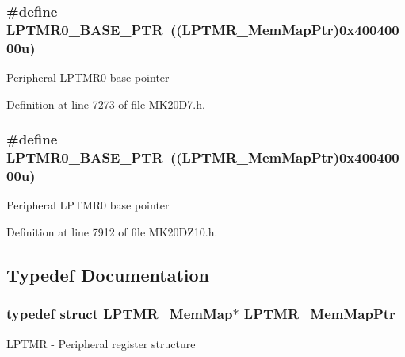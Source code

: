 \subsubsection[{\texorpdfstring{L\+P\+T\+M\+R0\+\_\+\+B\+A\+S\+E\+\_\+\+P\+TR}{LPTMR0_BASE_PTR}}]{\setlength{\rightskip}{0pt plus 5cm}\#define L\+P\+T\+M\+R0\+\_\+\+B\+A\+S\+E\+\_\+\+P\+TR~(({\bf L\+P\+T\+M\+R\+\_\+\+Mem\+Map\+Ptr})0x40040000u)}\hypertarget{group___l_p_t_m_r___peripheral_ga90a9194151ad11b422bcab162e797eda}{}\label{group___l_p_t_m_r___peripheral_ga90a9194151ad11b422bcab162e797eda}
Peripheral L\+P\+T\+M\+R0 base pointer 

Definition at line 7273 of file M\+K20\+D7.\+h.

\subsubsection[{\texorpdfstring{L\+P\+T\+M\+R0\+\_\+\+B\+A\+S\+E\+\_\+\+P\+TR}{LPTMR0_BASE_PTR}}]{\setlength{\rightskip}{0pt plus 5cm}\#define L\+P\+T\+M\+R0\+\_\+\+B\+A\+S\+E\+\_\+\+P\+TR~(({\bf L\+P\+T\+M\+R\+\_\+\+Mem\+Map\+Ptr})0x40040000u)}\hypertarget{group___l_p_t_m_r___peripheral_ga90a9194151ad11b422bcab162e797eda}{}\label{group___l_p_t_m_r___peripheral_ga90a9194151ad11b422bcab162e797eda}
Peripheral L\+P\+T\+M\+R0 base pointer 

Definition at line 7912 of file M\+K20\+D\+Z10.\+h.



\subsection{Typedef Documentation}
\subsubsection[{\texorpdfstring{L\+P\+T\+M\+R\+\_\+\+Mem\+Map\+Ptr}{LPTMR_MemMapPtr}}]{\setlength{\rightskip}{0pt plus 5cm}typedef struct {\bf L\+P\+T\+M\+R\+\_\+\+Mem\+Map}$\ast$ {\bf L\+P\+T\+M\+R\+\_\+\+Mem\+Map\+Ptr}}\hypertarget{group___l_p_t_m_r___peripheral_ga765226e2eeb35160c12820d4a2541320}{}\label{group___l_p_t_m_r___peripheral_ga765226e2eeb35160c12820d4a2541320}
L\+P\+T\+MR -\/ Peripheral register structure 
